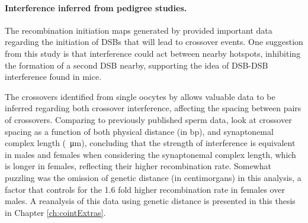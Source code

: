 

\paragraph{Interference inferred from pedigree studies.}

The recombination initiation maps generated by \citet{Pratto2014} provided important data regarding the initiation of DSBs that will lead to crossover events.
One suggestion from this study is that interference could act between nearby hotspots, inhibiting the formation of a second DSB nearby, supporting the idea of DSB-DSB interference found in mice\cite{Baudat2007}.

The crossovers identified from single oocytes by \citet{Hou2013}
allows valuable data to be inferred regarding both crossover interference, affecting the spacing between pairs of crossovers.
Comparing to previously published sperm data\cite{Lu2012}, \citet{Hou2013} look at crossover spacing as a function of both physical distance (in bp), and synaptonemal complex length (\SI{}{\micro\metre}), concluding that the strength of interference is equivalent in males and females when considering the synaptonemal complex length, which is longer in females, reflecting their higher recombination rate.
Somewhat puzzling was the omission of genetic distance (in centimorgans) in this analysis, a factor that controls for the 1.6 fold higher recombination rate in females over males.
A reanalysis of this data using genetic distance is presented in this thesis in Chapter \ref{ch:cointExtras}.



